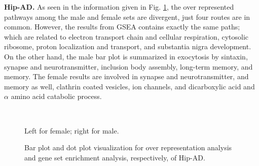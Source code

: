 \textbf{Hip-AD.} As seen in the information given in Fig. \ref{fig:path-hip-ad}, the over represented pathways among the male and female sets are divergent, just four routes are in common. However, the results from GSEA contains exactly the same paths; which are related to electron transport chain and cellular respiration, cytosolic ribosome, proton localization and transport, and substantia nigra development. On the other hand, the male bar plot is summarized in exocytosis by sintaxin, synapse and neurotransmitter, inclusion body assembly, long-term memory, and memory. The female results are involved in synapse and neurotransmitter, and memory as well, clathrin coated vesicles, ion channels, and dicarboxylic acid and $\alpha$ amino acid catabolic process.

\begin{figure}[!ht]%
    \centering
    \qquad
    \\
    \qquad
\caption{Bar plot and dot plot visualization for over representation analysis and gene set enrichment analysis, respectively, of Hip-AD.}
\footnotesize Left for female; right for male.
\label{fig:path-hip-ad}%
\end{figure}

